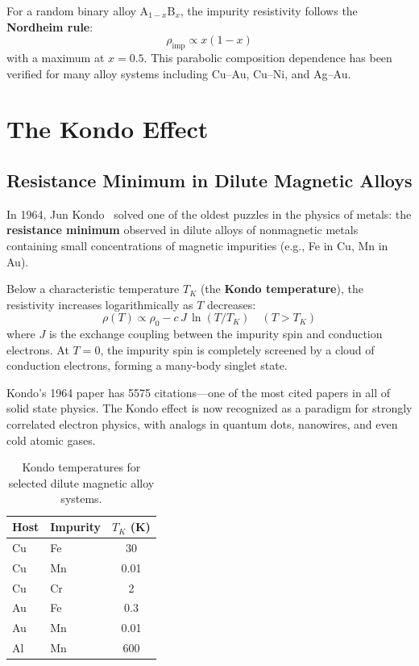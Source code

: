 For a random binary alloy A$_{1-x}$B$_x$, the impurity resistivity follows the \textbf{Nordheim rule}:
\begin{equation}
  \rho_{\text{imp}} \propto x(1-x)
\end{equation}
with a maximum at $x = 0.5$. This parabolic composition dependence has been verified for many alloy systems including Cu--Au, Cu--Ni, and Ag--Au.


\section{The Kondo Effect}

\subsection{Resistance Minimum in Dilute Magnetic Alloys}

In 1964, Jun Kondo~\cite{kondo1964resistance} solved one of the oldest puzzles in the physics of metals: the \textbf{resistance minimum} observed in dilute alloys of nonmagnetic metals containing small concentrations of magnetic impurities (e.g., Fe in Cu, Mn in Au).

Below a characteristic temperature $T_K$ (the \textbf{Kondo temperature}), the resistivity increases logarithmically as $T$ decreases:
\begin{equation}
  \rho(T) \propto \rho_0 - c\,J\,\ln(T/T_K) \quad (T > T_K)
\end{equation}
where $J$ is the exchange coupling between the impurity spin and conduction electrons. At $T = 0$, the impurity spin is completely screened by a cloud of conduction electrons, forming a many-body singlet state.

Kondo's 1964 paper has 5575 citations---one of the most cited papers in all of solid state physics. The Kondo effect is now recognized as a paradigm for strongly correlated electron physics, with analogs in quantum dots, nanowires, and even cold atomic gases.

\begin{table}[H]
\centering
\caption{Kondo temperatures for selected dilute magnetic alloy systems.}
\label{tab:kondo}
\begin{tabular}{@{}llS@{}}
\toprule
Host & Impurity & {$T_K$ (\si{\kelvin})} \\
\midrule
Cu & Fe & 30 \\
Cu & Mn & 0.01 \\
Cu & Cr & 2 \\
Au & Fe & 0.3 \\
Au & Mn & 0.01 \\
Al & Mn & 600 \\
\bottomrule
\end{tabular}
\end{table}

